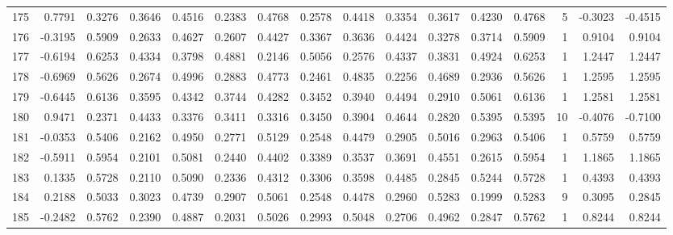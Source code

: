 \begin{tabular}{lrrrrrrrrrrrrrrr}
175 &      0.7791 &  0.3276 &  0.3646 &  0.4516 &  0.2383 &  0.4768 &  0.2578 &  0.4418 &  0.3354 &  0.3617 &   0.4230 &     0.4768 &      5 &                   -0.3023 &                    -0.4515 \\
176 &     -0.3195 &  0.5909 &  0.2633 &  0.4627 &  0.2607 &  0.4427 &  0.3367 &  0.3636 &  0.4424 &  0.3278 &   0.3714 &     0.5909 &      1 &                    0.9104 &                     0.9104 \\
177 &     -0.6194 &  0.6253 &  0.4334 &  0.3798 &  0.4881 &  0.2146 &  0.5056 &  0.2576 &  0.4337 &  0.3831 &   0.4924 &     0.6253 &      1 &                    1.2447 &                     1.2447 \\
178 &     -0.6969 &  0.5626 &  0.2674 &  0.4996 &  0.2883 &  0.4773 &  0.2461 &  0.4835 &  0.2256 &  0.4689 &   0.2936 &     0.5626 &      1 &                    1.2595 &                     1.2595 \\
179 &     -0.6445 &  0.6136 &  0.3595 &  0.4342 &  0.3744 &  0.4282 &  0.3452 &  0.3940 &  0.4494 &  0.2910 &   0.5061 &     0.6136 &      1 &                    1.2581 &                     1.2581 \\
180 &      0.9471 &  0.2371 &  0.4433 &  0.3376 &  0.3411 &  0.3316 &  0.3450 &  0.3904 &  0.4644 &  0.2820 &   0.5395 &     0.5395 &     10 &                   -0.4076 &                    -0.7100 \\
181 &     -0.0353 &  0.5406 &  0.2162 &  0.4950 &  0.2771 &  0.5129 &  0.2548 &  0.4479 &  0.2905 &  0.5016 &   0.2963 &     0.5406 &      1 &                    0.5759 &                     0.5759 \\
182 &     -0.5911 &  0.5954 &  0.2101 &  0.5081 &  0.2440 &  0.4402 &  0.3389 &  0.3537 &  0.3691 &  0.4551 &   0.2615 &     0.5954 &      1 &                    1.1865 &                     1.1865 \\
183 &      0.1335 &  0.5728 &  0.2110 &  0.5090 &  0.2336 &  0.4312 &  0.3306 &  0.3598 &  0.4485 &  0.2845 &   0.5244 &     0.5728 &      1 &                    0.4393 &                     0.4393 \\
184 &      0.2188 &  0.5033 &  0.3023 &  0.4739 &  0.2907 &  0.5061 &  0.2548 &  0.4478 &  0.2960 &  0.5283 &   0.1999 &     0.5283 &      9 &                    0.3095 &                     0.2845 \\
185 &     -0.2482 &  0.5762 &  0.2390 &  0.4887 &  0.2031 &  0.5026 &  0.2993 &  0.5048 &  0.2706 &  0.4962 &   0.2847 &     0.5762 &      1 &                    0.8244 &                     0.8244 \\

\end{tabular}
